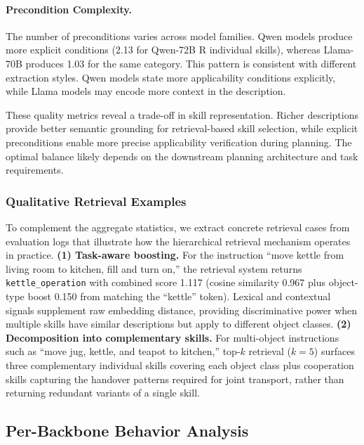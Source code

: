 \documentclass{article}
\theoremstyle{plain}
\theoremstyle{definition}
\theoremstyle{remark}
\begin{document}
\paragraph{Precondition Complexity.}
The number of preconditions varies across model families. Qwen models produce more explicit conditions (2.13 for Qwen-72B R individual skills), whereas Llama-70B produces 1.03 for the same category. This pattern is consistent with different extraction styles. Qwen models state more applicability conditions explicitly, while Llama models may encode more context in the description.

These quality metrics reveal a trade-off in skill representation. Richer descriptions provide better semantic grounding for retrieval-based skill selection, while explicit preconditions enable more precise applicability verification during planning. The optimal balance likely depends on the downstream planning architecture and task requirements.

\subsubsection{Qualitative Retrieval Examples}
\label{subsec:retrieval_examples}

To complement the aggregate statistics, we extract concrete retrieval cases from evaluation logs that illustrate how the hierarchical retrieval mechanism operates in practice. \textbf{(1) Task-aware boosting.} For the instruction ``move kettle from living room to kitchen, fill and turn on,'' the retrieval system returns \texttt{kettle\_operation} with combined score 1.117 (cosine similarity 0.967 plus object-type boost 0.150 from matching the ``kettle'' token). Lexical and contextual signals supplement raw embedding distance, providing discriminative power when multiple skills have similar descriptions but apply to different object classes. \textbf{(2) Decomposition into complementary skills.} For multi-object instructions such as ``move jug, kettle, and teapot to kitchen,'' top-$k$ retrieval ($k{=}5$) surfaces three complementary individual skills covering each object class plus cooperation skills capturing the handover patterns required for joint transport, rather than returning redundant variants of a single skill.

\subsection{Per-Backbone Behavior Analysis}
\label{sec:per_backbone}
\end{document}

